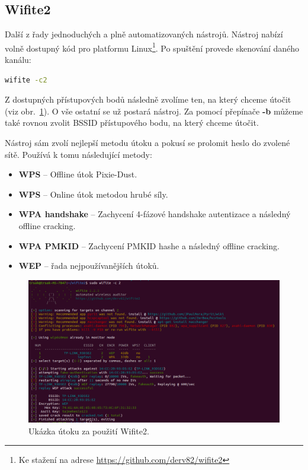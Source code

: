 \subsection{Wifite2}
Další z řady jednoduchých a plně automatizovaných nástrojů. Nástroj nabízí volně dostupný kód pro platformu Linux\footnote{Ke stažení na adrese \url{https://github.com/derv82/wifite2}}. Po spuštění provede skenování daného kanálu:
\begin{lstlisting}[language=bash]
wifite -c2
\end{lstlisting}
Z dostupných přístupových bodů následně zvolíme ten, na který chceme útočit (viz obr.~\ref{img:wifite}). O vše ostatní se už postará nástroj. Za pomocí přepínače \textbf{-b} můžeme také rovnou zvolit BSSID přístupového bodu, na který chceme útočit.

Nástroj sám zvolí nejlepší metodu útoku a pokusí se prolomit heslo do zvolené sítě. Používá k tomu následující metody:
\begin{itemize}
  \item{\textbf{WPS} -- Offline útok Pixie-Dust.}
  \item{\textbf{WPS} -- Online útok metodou hrubé síly.}
  \item{\textbf{WPA handshake} -- Zachycení 4-fázové handshake autentizace a následný offline cracking.}
  \item{\textbf{WPA PMKID} -- Zachycení PMKID hashe a následný offline cracking.}
  \item{\textbf{WEP} -- řada nejpoužívanějších útoků.}
\end{itemize}

\begin{figure}[htbp]
  \centering
  \includegraphics[width=14.7cm]{obrazky-figures/wifite.png}
  \caption{Ukázka útoku za použití Wifite2.}
  \label{img:wifite}
\end{figure}

